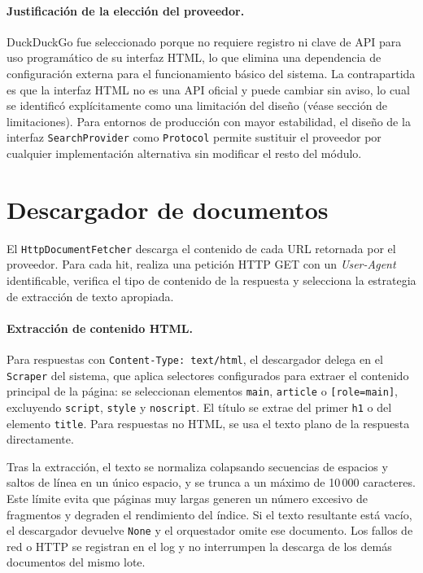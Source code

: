 \documentclass[11pt]{article}
\begin{document}
\paragraph{Justificación de la elección del proveedor.}
DuckDuckGo fue seleccionado porque no requiere registro ni clave de API para uso programático
de su interfaz HTML, lo que elimina una dependencia de configuración externa para el
funcionamiento básico del sistema. La contrapartida es que la interfaz HTML no es una API
oficial y puede cambiar sin aviso, lo cual se identificó explícitamente como una limitación
del diseño (véase sección de limitaciones). Para entornos de producción con mayor estabilidad,
el diseño de la interfaz \texttt{SearchProvider} como \texttt{Protocol} permite sustituir el
proveedor por cualquier implementación alternativa sin modificar el resto del módulo.

\section{Descargador de documentos}

El \texttt{HttpDocumentFetcher} descarga el contenido de cada URL retornada por el proveedor.
Para cada hit, realiza una petición HTTP GET con un \emph{User-Agent} identificable, verifica
el tipo de contenido de la respuesta y selecciona la estrategia de extracción de texto
apropiada.

\paragraph{Extracción de contenido HTML.}
Para respuestas con \texttt{Content-Type: text/html}, el descargador delega en el
\texttt{Scraper} del sistema, que aplica selectores configurados para extraer el contenido
principal de la página: se seleccionan elementos \texttt{main}, \texttt{article} o
\texttt{[role=main]}, excluyendo \texttt{script}, \texttt{style} y \texttt{noscript}. El
título se extrae del primer \texttt{h1} o del elemento \texttt{title}. Para respuestas no
HTML, se usa el texto plano de la respuesta directamente.

Tras la extracción, el texto se normaliza colapsando secuencias de espacios y saltos de línea
en un único espacio, y se trunca a un máximo de 10\,000 caracteres. Este límite evita que
páginas muy largas generen un número excesivo de fragmentos y degraden el rendimiento del
índice. Si el texto resultante está vacío, el descargador devuelve \texttt{None} y el
orquestador omite ese documento. Los fallos de red o HTTP se registran en el log y no
interrumpen la descarga de los demás documentos del mismo lote.
\end{document}
